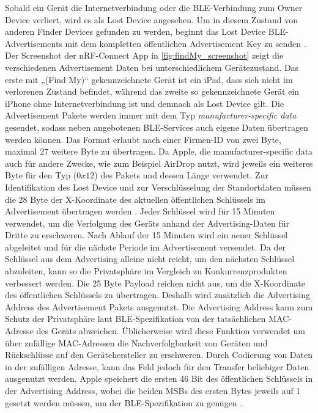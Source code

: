 Sobald ein Gerät die Internetverbindung oder die \ac{BLE}-Verbindung zum Owner Device verliert, wird es als Lost Device angesehen.
Um in diesem Zustand von anderen Finder Devices gefunden zu werden, beginnt das Lost Device \ac{BLE}-Advertisements mit dem kompletten öffentlichen Advertisement Key zu senden \cite{Apple_FindMySpec}.
Der Screenshot der nRF-Connect App in \autoref{fig:findMy_screenshot} zeigt die verschiedenen Advertisement Daten bei unterschiedlichem Gerätezustand.
Das erste mit „(Find My)“ gekennzeichnete Gerät ist ein iPad, dass sich nicht im verlorenen Zustand befindet, während das zweite so gekennzeichnete Gerät ein iPhone ohne Internetverbindung ist und demnach als Lost Device gilt.
Die Advertisement Pakete werden immer mit dem Typ \textit{manufacturer-specific data} gesendet, sodass neben angebotenen \ac{BLE}-Services auch eigene Daten übertragen werden können.
Das Format erlaubt nach einer Firmen-ID von zwei Byte, maximal 27 weitere Byte zu übertragen.
Da Apple, die manufacturer-specific data auch für andere Zwecke, wie zum Beispiel AirDrop nutzt, wird jeweils ein weiteres Byte für den Typ ($0x12$) des Pakets und dessen Länge verwendet.
Zur Identifikation des Lost Device und zur Verschlüsselung der Standortdaten müssen die 28 Byte der X-Koordinate des aktuellen öffentlichen Schlüssels im Advertisement übertragen werden \cite{Heinrich_FindMy}.
Jeder Schlüssel wird für 15 Minuten verwendet, um die Verfolgung des Geräts anhand der Advertising-Daten für Dritte zu erschweren.
Nach Ablauf der 15 Minuten wird ein neuer Schlüssel abgeleitet und für die nächste Periode im Advertisement versendet.
Da der Schlüssel aus dem Advertising alleine nicht reicht, um den nächsten Schlüssel abzuleiten, kann so die Privatsphäre im Vergleich zu Konkurrenzprodukten verbessert werden.
Die 25 Byte Payload reichen nicht aus, um die X-Koordinate des öffentlichen Schlüssels zu übertragen.
Deshalb  wird zusätzlich die Advertising Address des Advertisement Pakets ausgenutzt.
Die Advertising Address kann zum Schutz der Privatsphäre laut \ac{BLE}-Spezifikation \cite{Spec_BLE_5.3} von der tatsächlichen \ac{MAC}-Adresse des Geräts abweichen.
Üblicherweise wird diese Funktion verwendet um über zufällige \ac{MAC}-Adressen die Nachverfolgbarkeit von Geräten und Rückschlüsse auf den Gerätehersteller zu erschweren.
Durch Codierung von Daten in der zufälligen Adresse, kann das Feld jedoch für den Transfer beliebiger Daten ausgenutzt werden.
Apple speichert die ersten 46 Bit des öffentlichen Schlüssels in der Advertising Address, wobei die beiden \acp{MSB} des ersten Bytes jeweils auf 1 gesetzt werden müssen, um der \ac{BLE}-Spezifikation zu genügen \cite{Heinrich_FindMy}.
